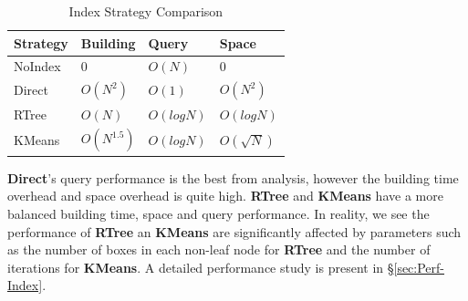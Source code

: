 \documentclass{sig-alternate}
\begin{document}
\begin{table}[t]
\begin{center}
    \caption{Index Strategy Comparison}
    \begin{scriptsize}
    \begin{tabular}{ | p{1.75cm} | p{1.75cm} | p{1.75cm} | p{1.75cm} |}
    \hline
    Strategy & Building & Query & Space \\ \hline \hline
    NoIndex & 0 & $O(N)$ & 0 \\ \hline
    Direct & $O(N^2)$ & $O(1)$ & $O(N^2)$ \\ \hline
    RTree & $O(N)$ & $O(logN)$ & $O(logN)$ \\ \hline
    KMeans & $O(N^{1.5})$ & $O(logN)$ & $O(\sqrt{N})$ \\ \hline
    \end{tabular}
    \end{scriptsize}
    \label{tb:index-comparison}
\end{center}   
\end{table}

{\bf Direct}'s query performance is the best from analysis, however the building time overhead and space overhead is quite high.
{\bf RTree} and {\bf KMeans} have a more balanced building time, space and query performance.
In reality, we see the performance of {\bf RTree} an {\bf KMeans} are significantly affected by parameters such as the
number of boxes in each non-leaf node for {\bf RTree} and the number of iterations for {\bf KMeans}.
A detailed performance study is present in \S\ref{sec:Perf-Index}.

\end{document}
